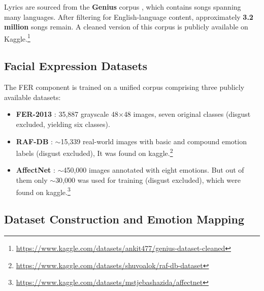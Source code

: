 \documentclass[11pt]{article}
\begin{document}
Lyrics are sourced from the \textbf{Genius} corpus
\cite{lim2021expertise}, which contains songs spanning
many languages.  After filtering for English-language content,
approximately \textbf{3.2 million} songs remain.  A cleaned
version of this corpus is publicly available on
Kaggle.\footnote{\url{https://www.kaggle.com/datasets/ankit477/genius-dataset-cleaned}}



\subsection{Facial Expression Datasets}
\label{facial_expression_datasets}

The FER component is trained on a unified corpus comprising
three publicly available datasets:

\begin{itemize}
  \item \textbf{FER-2013} \cite{goodfellow2013challenges}:
        35{,}887 grayscale 48$\times$48 images, seven original
        classes (disgust excluded, yielding six classes).
  \item \textbf{RAF-DB} \cite{li2017reliable}: $\sim$15{,}339
        real-world images with basic and compound emotion labels
        (disgust excluded), It was found on kaggle.\footnote{\url{https://www.kaggle.com/datasets/shuvoalok/raf-db-dataset}}
  
        \item \textbf{AffectNet} \cite{mollahosseini2019affectnet}:
        $\sim$450{,}000 images annotated with eight emotions. But out of them 
        only $\sim$30{,}000 was used for training (disgust excluded), which were found on kaggle.\footnote{\url{https://www.kaggle.com/datasets/mstjebashazida/affectnet}}
\end{itemize}


\subsection{Dataset Construction and Emotion Mapping}
\label{sec:dataset}
\end{document}
